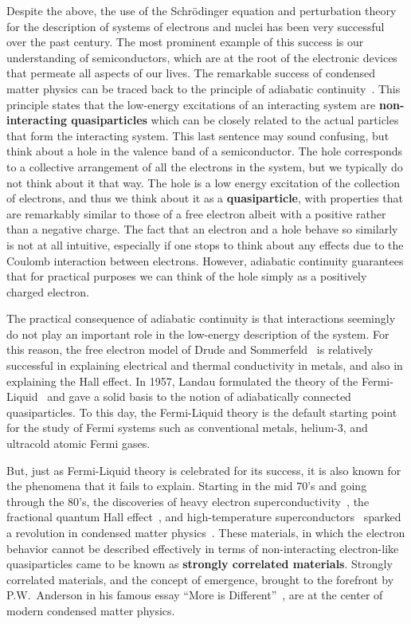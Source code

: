 Despite the above,  the use of the Schr\"{o}dinger equation and perturbation
theory for the description of  systems of electrons and nuclei has been very
successful over the past century.  The most prominent example of this success
is our understanding of semiconductors, which are at the root of the electronic
devices that permeate all aspects of our lives.  The remarkable success of
condensed matter physics can be traced back to the principle of adiabatic
continuity~\cite{altland2010condensed}. This principle  states that  the
low-energy excitations of an interacting system  are  \textbf{non-interacting
quasiparticles} which can be closely related to the actual particles that form
the interacting system.   This last sentence may sound confusing, but think
about a hole in the valence band of a semiconductor.  The hole corresponds to a
collective arrangement of all the electrons in the system, but we typically do
not think about it that way.  The hole is a low energy excitation of the
collection of electrons, and thus we think about it as a
\textbf{quasiparticle}, with properties that are remarkably similar to those of
a free electron albeit with a positive rather than a negative charge.  The fact
that an electron and a hole behave so similarly is not at all intuitive,
especially if one stops to think about any effects due to the  Coulomb
interaction between electrons. However, adiabatic continuity guarantees that
for practical purposes we can think of the hole simply as a positively charged
electron.  

The practical consequence of adiabatic continuity is that interactions
seemingly do not play an important role in the low-energy description of the
system.  For this reason, the free electron model of Drude and
Sommerfeld~\cite{ashcroft1976solid} is relatively successful in explaining
electrical and thermal conductivity in metals,  and also in explaining the Hall
effect.   In 1957, Landau formulated the theory of the
Fermi-Liquid~\cite{landau1965collected} and gave a solid basis to the notion of
adiabatically connected quasiparticles.  To this day, the Fermi-Liquid theory
is the default starting point for the study of Fermi systems such as
conventional metals, helium-3, and ultracold atomic Fermi gases.   

But, just as Fermi-Liquid theory is celebrated for its success, it is also
known for the phenomena that it fails to explain.   Starting in the mid 70's
and going through the 80's, the discoveries of heavy electron
superconductivity~\cite{PhysRevLett.35.1779,PhysRevLett.43.1892},  the
fractional quantum Hall effect~\cite{PhysRevLett.48.1559,PhysRevLett.50.1395},
and high-temperature superconductors~\cite{Zeitschrift.64.189} sparked a
revolution in condensed matter physics~\cite{coleman2004revolution}.   These
materials, in which the electron behavior cannot be described effectively in
terms of non-interacting electron-like quasiparticles came to be known as
\textbf{strongly correlated materials}.   Strongly correlated materials, and
the concept of emergence, brought to the forefront by P.W.~Anderson in his
famous essay ``More is Different''~\cite{Anderson1972}, are at the center of
modern condensed matter physics. 

